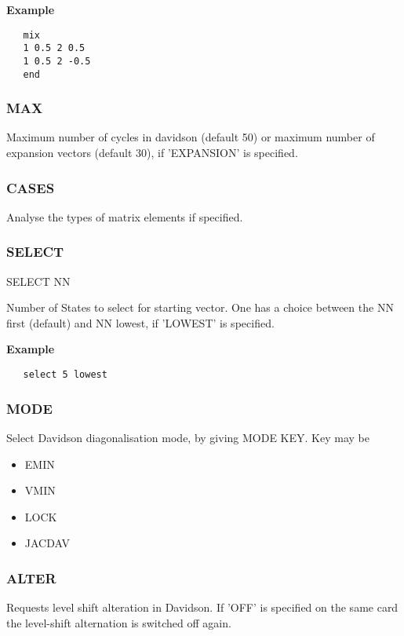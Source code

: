 \documentclass[11pt,fleqn]{article}
\begin{document}
{\bf Example}
\begin{verbatim}
   mix
   1 0.5 2 0.5
   1 0.5 2 -0.5
   end
\end{verbatim}

\subsubsection{MAX}

Maximum number of cycles in davidson (default 50) or maximum number of
expansion vectors (default 30), if 'EXPANSION' is specified. 

\subsubsection{CASES}

Analyse the types of matrix elements if specified. 

\subsubsection{SELECT}

SELECT NN 

Number of States to select for starting vector. One has a choice 
between the  NN first (default) and NN lowest, if 'LOWEST' is specified. 

{\bf Example}
\begin{verbatim}
   select 5 lowest
\end{verbatim}

\subsubsection{MODE}

Select Davidson diagonalisation mode, by giving MODE KEY.  Key may be

\begin{itemize}
\item EMIN
\item VMIN
\item LOCK
\item JACDAV
\end{itemize}

\subsubsection{ALTER}

Requests level shift alteration in Davidson. If 'OFF' is specified on the same 
card the level-shift alternation is switched off again. 
\end{document}
